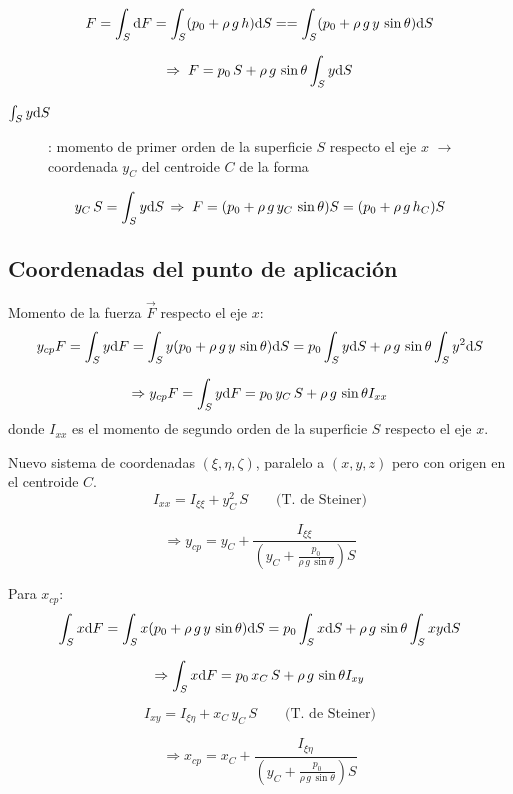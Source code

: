 \[
F=\int_{S}\text{d} F=\int_{S}(p_{0}+\rho\,g\,h)\text{d} S==\int_{S}(p_{0}+\rho\,g\,y\,\sin\theta)\text{d} S
\]

\[
\Rightarrow\;F=p_{0}\,S+\rho\,g\,\sin\theta\int_{S}y\text{d} S
\]

\begin{description}
\item [{$\int_{S}y\text{d} S$}] : momento de primer orden de la superficie
$S$ respecto el eje $x$ $\rightarrow$ coordenada $y_{C}$ del centroide
$C$ de la forma
\end{description}
\[
y_{C}\,S=\int_{S}y\text{d} S\,\Rightarrow\;F=(p_{0}+\rho\,g\,y_{C}\,\sin\theta)S=(p_{0}+\rho\,g\,h_{C})S
\]



\subsection{Coordenadas del punto de aplicación}


Momento de la fuerza $\vec{F}$ respecto el eje $x$: 
\[
y_{cp}F=\int_{S}y\text{d} F=\int_{S}y(p_{0}+\rho\,g\,y\,\sin\theta)\text{d} S=p_{0}\int_{S}y\text{d} S+\rho\,g\,\sin\theta\int_{S}y^{2}\text{d} S
\]
 
\[
\Rightarrow y_{cp}F=\int_{S}y\text{d} F=p_{0}\,y_{C}\,S+\rho\,g\,\sin\theta I_{xx}
\]
 donde $I_{xx}$ es el momento de segundo orden de la superficie $S$
respecto el eje $x$.

Nuevo sistema de coordenadas $(\xi,\eta,\zeta)$, paralelo a $(x,y,z)$
pero con origen en el centroide $C$. 
\[
I_{xx}=I_{\xi\xi}+y_{C}^{2}\,S\qquad\text{(T. de Steiner)}
\]

\[
\Rightarrow y_{cp}=y_{C}+\frac{I_{\xi\xi}}{\left(y_{C}+\frac{p_{0}}{\rho\,g\,\sin\theta}\right)S}
\]


Para $x_{cp}$: 
\[
\int_{S}x\text{d} F=\int_{S}x(p_{0}+\rho\,g\,y\,\sin\theta)\text{d} S=p_{0}\int_{S}x\text{d} S+\rho\,g\,\sin\theta\int_{S}xy\text{d} S
\]
 
\[
\Rightarrow\int_{S}x\text{d} F=p_{0}\,x_{C}\,S+\rho\,g\,\sin\theta I_{xy}
\]
 
\[
I_{xy}=I_{\xi\eta}+x_{C}\,y_{C}\,S\qquad\text{(T. de Steiner)}
\]
 
\[
\Rightarrow x_{cp}=x_{C}+\frac{I_{\xi\eta}}{\left(y_{C}+\frac{p_{0}}{\rho\,g\,\sin\theta}\right)S}
\]



